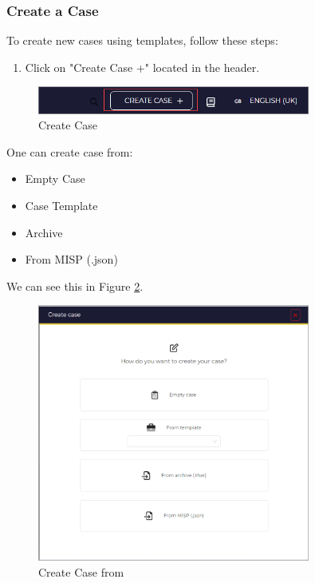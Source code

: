 \documentclass{article}
\begin{document}
\subsubsection*{Create a Case}

To create new cases using templates, follow these steps:

\begin{enumerate}
  \item Click on "Create Case +" located in the header.
\end{enumerate}

\begin{figure}[H]
    \centering
    \includegraphics[width=0.8\textwidth]{case1.png}
    \caption{Create Case}
    \label{fig:createcase}
\end{figure}

One can create case from:
\begin{itemize}
    \item Empty Case
    \item Case Template
    \item Archive
    \item From MISP (.json)

\end{itemize}

We can see this in Figure \ref{fig:casefrom}.
\begin{figure}[H]
    \centering
    \includegraphics[width=0.8\textwidth]{case2.png}
    \caption{Create Case from}
    \label{fig:casefrom}
\end{figure}
\end{document}

